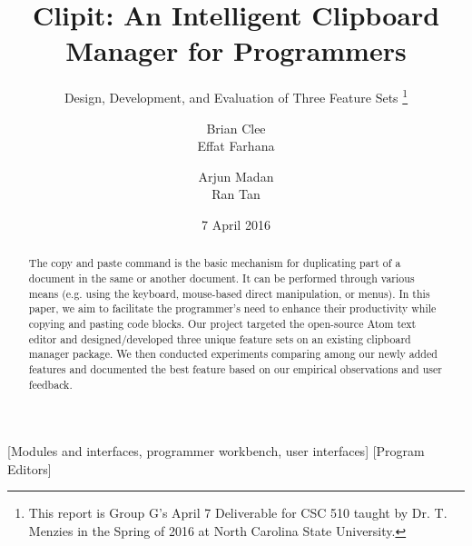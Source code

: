 \documentclass{acm_proc_article-sp}
\begin{document}
\title{Clipit: An Intelligent Clipboard Manager for Programmers}
\subtitle{Design, Development, and Evaluation of Three Feature Sets \thanks{This report is Group G's April 7 Deliverable for CSC 510 taught by Dr. T. Menzies in the Spring of 2016 at North Carolina State University.}}

\author{
\alignauthor
Brian Clee\\
\alignauthor
Effat Farhana\\
\and %
\alignauthor
Arjun Madan\\
\alignauthor
Ran Tan\\
}

\date{7 April 2016}
\maketitle

\begin{abstract}
The copy and paste command is the basic mechanism for duplicating part of a document in the same or another document. It can be performed through various means (e.g. using the keyboard, mouse-based direct manipulation, or menus). In this paper, we aim to facilitate the programmer's need to enhance their productivity while copying and pasting code blocks. Our project targeted the open-source Atom text editor and designed/developed three unique feature sets on an existing clipboard manager package. We then conducted experiments comparing among our newly added features and documented the best feature based on our empirical observations and user feedback. 

\end{abstract}

[Modules and interfaces, programmer workbench, user interfaces]
[Program Editors]

\end{document}

